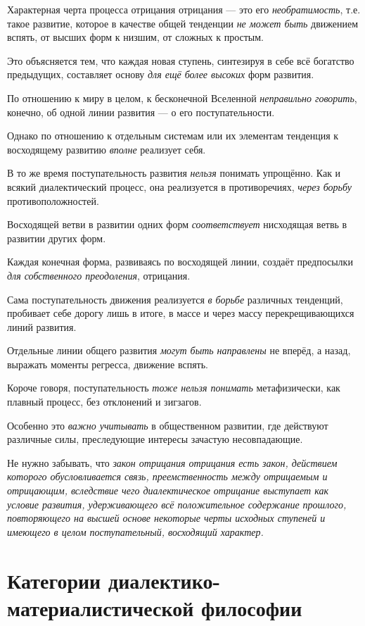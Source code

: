 \documentclass[a4paper,14pt,russian]{extreport}
\begin{document}
Характерная черта процесса отрицания отрицания --- это его \emph{необратимость}, т.е. такое развитие, которое в качестве общей тенденции \emph{не может быть} движением вспять, от высших форм к низшим, от сложных к простым.

Это объясняется тем, что каждая новая ступень, синтезируя в себе всё богатство предыдущих, составляет основу \emph{для ещё более высоких} форм развития.

По отношению к миру в целом, к бесконечной Вселенной \emph{неправильно говорить}, конечно, об одной линии развития --- о его поступательности.

Однако по отношению к отдельным системам или их элементам тенденция к восходящему развитию \emph{вполне} реализует себя.

В то же время поступательность развития \emph{нельзя} понимать упрощённо. Как и всякий диалектический процесс, она реализуется в противоречиях, \emph{через борьбу} противоположностей.

Восходящей ветви в развитии одних форм \emph{соответствует} нисходящая ветвь в развитии других форм.

Каждая конечная форма, развиваясь по восходящей линии, создаёт предпосылки \emph{для собственного преодоления}, отрицания.

Сама поступательность движения реализуется \emph{в борьбе} различных тенденций, пробивает себе дорогу лишь в итоге, в массе и через массу перекрещивающихся линий развития.

Отдельные линии общего развития \emph{могут быть направлены} не вперёд, а назад, выражать моменты регресса, движение вспять.

Короче говоря, поступательность \emph{тоже нельзя понимать} метафизически, как плавный процесс, без отклонений и зигзагов.

Особенно это \emph{важно учитывать} в общественном развитии, где действуют различные силы, преследующие интересы зачастую несовпадающие.

Не нужно забывать, что \emph{закон отрицания отрицания есть закон, действием которого обусловливается связь, преемственность между отрицаемым и отрицающим, вследствие чего диалектическое отрицание выступает как условие развития, удерживающего всё положительное содержание прошлого, повторяющего на высшей основе некоторые черты исходных ступеней и имеющего в целом поступательный, восходящий характер.}

\section{Категории диалектико-материалистической философии}
\end{document}

